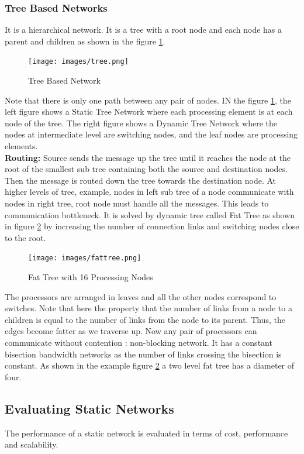 \documentclass[12pt]{book}
\begin{document}
\subsubsection{Tree Based Networks}
It is a hierarchical network. It is a tree with a root node and each node has a parent and children
as shown in the figure \ref{fig:tree}.
\begin{figure}[H]
    \centering
    \texttt{[image: images/tree.png]}
    \caption{Tree Based Network}
    \label{fig:tree}
\end{figure}
Note that there is only one path between any pair of nodes.
IN the figure \ref{fig:tree}, the left figure shows a Static Tree Network where each processing element is at 
each node of the tree. The right figure shows a Dynamic Tree Network where the nodes at intermediate level
are switching nodes, and the leaf nodes are processing elements.\\
\textbf{Routing: }Source sends the message up the tree until it reaches the node at the root of the smallest sub tree containing both the 
source and destination nodes. Then the message is routed down the tree towards the destination node.
At higher levels of tree, example, nodes in left sub tree of a node communicate with nodes in right tree, root node must handle all the messages. This leads to
communication bottleneck. It is solved by dynamic tree called Fat Tree as shown in figure \ref{fig:fattree} by increasing the number of connection links and switching nodes close to the root.
\begin{figure}[H]
    \centering
    \texttt{[image: images/fattree.png]}
    \caption{Fat Tree with 16 Processing Nodes}
    \label{fig:fattree}
\end{figure}
The processors are arranged in leaves and all the other nodes correspond to switches. Note that here the property that 
the number of links from a node to a children is equal to the number of links from the node to its parent. Thus, the edges become fatter as we traverse up.
Now any pair of processors can communicate without contention : non-blocking network. It has a constant bisection bandwidth networks as 
the number of links crossing the bisection is constant. As shown in the example figure \ref{fig:fattree} a two level fat tree has a diameter of four.
\subsection{Evaluating Static Networks}
The performance of a static network is evaluated in terms of cost, performance and scalability.
\end{document}
